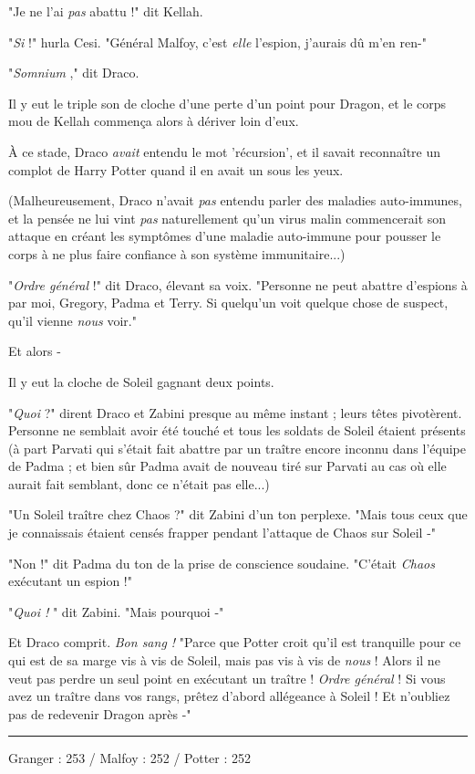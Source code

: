 "Je ne l'ai \emph{pas}  abattu !" dit Kellah.

"\emph{Si}  !" hurla Cesi. "Général Malfoy, c'est \emph{elle}  l'espion, j'aurais dû m'en ren-"

"\emph{Somnium} ," dit Draco.

Il y eut le triple son de cloche d'une perte d'un point pour Dragon, et le corps mou de Kellah commença alors à dériver loin d'eux.

À ce stade, Draco \emph{avait}  entendu le mot 'récursion', et il savait reconnaître un complot de Harry Potter quand il en avait un sous les yeux.

(Malheureusement, Draco n'avait \emph{pas}  entendu parler des maladies auto-immunes, et la pensée ne lui vint \emph{pas}  naturellement qu'un virus malin commencerait son attaque en créant les symptômes d'une maladie auto-immune pour pousser le corps à ne plus faire confiance à son système immunitaire...)

"\emph{Ordre général}  !" dit Draco, élevant sa voix. "Personne ne peut abattre d'espions à par moi, Gregory, Padma et Terry. Si quelqu'un voit quelque chose de suspect, qu'il vienne \emph{nous}  voir."

Et alors -

Il y eut la cloche de Soleil gagnant deux points.

"\emph{Quoi}  ?" dirent Draco et Zabini presque au même instant ; leurs têtes pivotèrent. Personne ne semblait avoir été touché et tous les soldats de Soleil étaient présents (à part Parvati qui s'était fait abattre par un traître encore inconnu dans l'équipe de Padma ; et bien sûr Padma avait de nouveau tiré sur Parvati au cas où elle aurait fait semblant, donc ce n'était pas elle...)

"Un Soleil traître chez Chaos ?" dit Zabini d'un ton perplexe. "Mais tous ceux que je connaissais étaient censés frapper pendant l'attaque de Chaos sur Soleil -"

"Non !" dit Padma du ton de la prise de conscience soudaine. "C'était \emph{Chaos}  exécutant un espion !"

"\emph{Quoi !} " dit Zabini. "Mais pourquoi -"

Et Draco comprit. \emph{Bon sang !}  "Parce que Potter croit qu'il est tranquille pour ce qui est de sa marge vis à vis de Soleil, mais pas vis à vis de \emph{nous}  ! Alors il ne veut pas perdre un seul point en exécutant un traître ! \emph{Ordre général } ! Si vous avez un traître dans vos rangs, prêtez d'abord allégeance à Soleil ! Et n'oubliez pas de redevenir Dragon après -"
\par\noindent\rule{\textwidth}{0.4pt}
Granger : 253 / Malfoy : 252 / Potter : 252

